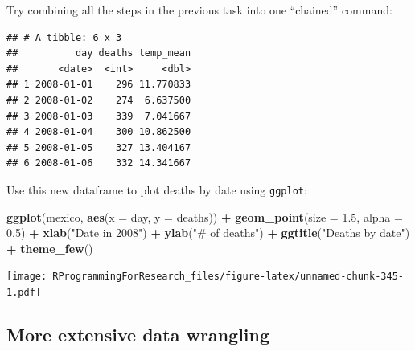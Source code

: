 \documentclass[]{book}
\makeatletter
\newenvironment{Shaded}{\begin{snugshade}}{\end{snugshade}}
\newcommand{\KeywordTok}[1]{\textcolor[rgb]{0.13,0.29,0.53}{\textbf{#1}}}
\newcommand{\DataTypeTok}[1]{\textcolor[rgb]{0.13,0.29,0.53}{#1}}
\newcommand{\FloatTok}[1]{\textcolor[rgb]{0.00,0.00,0.81}{#1}}
\newcommand{\StringTok}[1]{\textcolor[rgb]{0.31,0.60,0.02}{#1}}
\newcommand{\OperatorTok}[1]{\textcolor[rgb]{0.81,0.36,0.00}{\textbf{#1}}}
\newcommand{\NormalTok}[1]{#1}
\newenvironment{kframe}{%
\medskip{}
\setlength{\fboxsep}{.8em}
 \def\at@end@of@kframe{}%
 \ifinner\ifhmode%
  \def\at@end@of@kframe{\end{minipage}}%
  \begin{minipage}{\columnwidth}%
 \fi\fi%
 \def\FrameCommand##1{\hskip\@totalleftmargin \hskip-\fboxsep
 \colorbox{shadecolor}{##1}\hskip-\fboxsep
     \hskip-\linewidth \hskip-\@totalleftmargin \hskip\columnwidth}%
 \MakeFramed {\advance\hsize-\width
   \@totalleftmargin\z@ \linewidth\hsize
   \@setminipage}}%
 {\par\unskip\endMakeFramed%
 \at@end@of@kframe}
\renewenvironment{Shaded}{\begin{kframe}}{\end{kframe}}
\theoremstyle{definition}
\theoremstyle{definition}
\theoremstyle{definition}
\theoremstyle{remark}
\makeatother
\begin{document}
Try combining all the steps in the previous task into one ``chained''
command:

\begin{Shaded}
\end{Shaded}

\begin{verbatim}
## # A tibble: 6 x 3
##          day deaths temp_mean
##       <date>  <int>     <dbl>
## 1 2008-01-01    296 11.770833
## 2 2008-01-02    274  6.637500
## 3 2008-01-03    339  7.041667
## 4 2008-01-04    300 10.862500
## 5 2008-01-05    327 13.404167
## 6 2008-01-06    332 14.341667
\end{verbatim}

Use this new dataframe to plot deaths by date using \texttt{ggplot}:

\begin{Shaded}
\begin{Highlighting}[]
\KeywordTok{ggplot}\NormalTok{(mexico, }\KeywordTok{aes}\NormalTok{(}\DataTypeTok{x =}\NormalTok{ day, }\DataTypeTok{y =}\NormalTok{ deaths)) }\OperatorTok{+}\StringTok{ }
\StringTok{        }\KeywordTok{geom_point}\NormalTok{(}\DataTypeTok{size =} \FloatTok{1.5}\NormalTok{, }\DataTypeTok{alpha =} \FloatTok{0.5}\NormalTok{) }\OperatorTok{+}\StringTok{ }
\StringTok{        }\KeywordTok{xlab}\NormalTok{(}\StringTok{"Date in 2008"}\NormalTok{) }\OperatorTok{+}\StringTok{ }\KeywordTok{ylab}\NormalTok{(}\StringTok{"# of deaths"}\NormalTok{) }\OperatorTok{+}\StringTok{ }
\StringTok{        }\KeywordTok{ggtitle}\NormalTok{(}\StringTok{"Deaths by date"}\NormalTok{) }\OperatorTok{+}\StringTok{ }
\StringTok{        }\KeywordTok{theme_few}\NormalTok{()}
\end{Highlighting}
\end{Shaded}

\texttt{[image: RProgrammingForResearch\_files/figure-latex/unnamed-chunk-345-1.pdf]}

\subsection{More extensive data
wrangling}\label{more-extensive-data-wrangling}
\end{document}
